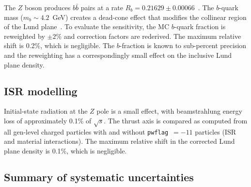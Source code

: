 \documentclass[11pt,a4paper]{article}
\begin{document}
The $Z$ boson produces $b\bar{b}$ pairs at a rate $R_b = 0.21629
\pm 0.00066$~\cite{ParticleDataGroup:2024cfk}.  The $b$-quark mass
($m_b \sim 4.2$~GeV) creates a dead-cone effect that modifies the
collinear region of the Lund plane~\cite{LHCb:2025viq}.  To evaluate
the sensitivity, the MC $b$-quark fraction is reweighted by $\pm 2\%$
and correction factors are rederived.  The maximum relative shift is
0.2\%, which is negligible.  The $b$-fraction is known to sub-percent
precision and the reweighting has a correspondingly small effect on
the inclusive Lund plane density.

\subsection{ISR modelling}
\label{sec:syst-isr}

Initial-state radiation at the $Z$ pole is a small effect, with
beamstrahlung energy loss of approximately 0.1\% of $\sqrt{s}$.  The
thrust axis is compared as computed from all gen-level charged particles
with and without \texttt{pwflag}~$= -11$ particles (ISR and material
interactions).  The maximum relative shift in the corrected Lund plane
density is 0.1\%, which is negligible.

\subsection{Summary of systematic uncertainties}
\label{sec:syst-summary}
\end{document}
